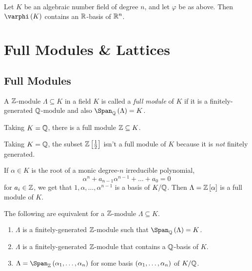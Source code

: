 \documentclass[11pt]{karticle}
\begin{document}
\begin{proposition}
Let $K$ be an algebraic number field of degree $n$, and let $\varphi$ be as above. Then $\varphi\prs{K}$ contains an $\mathbb{R}$-basis of $\mathbb{R}^n$.
\end{proposition}


\section{Full Modules \& Lattices}

\subsection{Full Modules}

\begin{definition}
A $\mathbb{Z}$-module $\Lambda \subseteq K$ in a field $K$ is called a \emph{full module} of $K$ if it is a finitely-generated $\mathbb{Q}$-module and also $\Span_{\mbb{Q}}\prs{\Lambda} = K$.
\end{definition}

\begin{example}
Taking $K = \mathbb{Q}$, there is a full module $\mathbb{Z} \subseteq K$.
\end{example}

\begin{example}
Taking $K = \mathbb{Q}$, the subset $\mathbb{Z}\left[ \frac{1}{2} \right]$ isn't a full module of $K$ because it is \emph{not} finitely generated.
\end{example}

\begin{example}
If $\alpha \in K$ is the root of a monic degree-$n$ irreducible polynomial,
\[\alpha^n + a_{n-1} \alpha^{n-1} + \ldots + a_0 = 0\]
for $a_i \in \mathbb{Z}$, we get that $1, \alpha, \ldots, \alpha^{n-1}$ is a basis of $K/\mathbb{Q}$.
Then $\Lambda = \mathbb{Z}\left[ \alpha \right]$ is a full module of $K$.
\end{example}

\begin{lemma}
The following are equivalent for a $\mathbb{Z}$-module $\Lambda \subseteq K$.

\begin{enumerate}
\item $\Lambda$ is a finitely-generated $\mathbb{Z}$-module such that $\Span_{\mbb{Q}}\prs{\Lambda} = K$.
\item $\Lambda$ is a finitely-generated $\mathbb{Z}$-module that contains a $\mathbb{Q}$-basis of $K$.
\item $\Lambda = \Span_{\mbb{Z}}\prs{\alpha_1, \ldots, \alpha_n}$ for some basis $\left( \alpha_1, \ldots, \alpha_n \right)$ of $K/\mathbb{Q}$. 
\end{enumerate}
\end{lemma}
\end{document}
